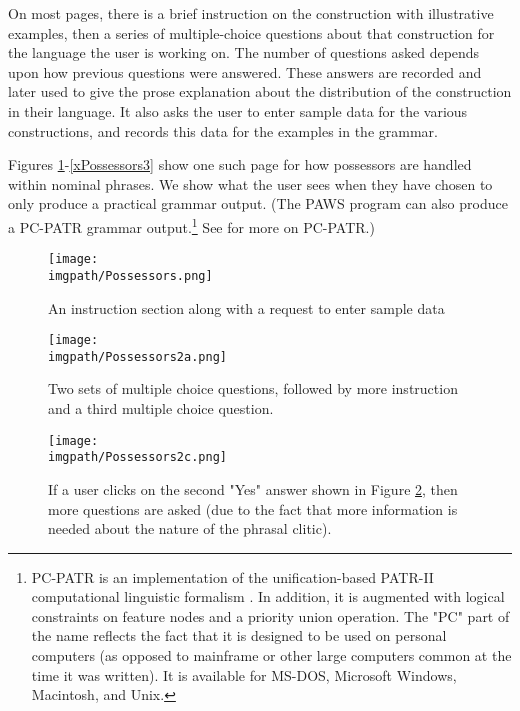 On most pages, there is a brief instruction on the construction with illustrative examples, then a series of multiple-choice questions about that construction for the language the user is working on. The number of questions asked depends upon how previous questions were answered. These answers are recorded and later used to give the prose explanation about the distribution of the construction in their language. It also asks the user to enter sample data for the various constructions, and records this data for the examples in the grammar.

Figures \ref{xPossesors1}-\ref{xPossessors3} show one such page for how possessors are handled within nominal phrases. We show what the user sees when they have chosen to only produce a practical grammar output. (The {PAWS} program can also produce a PC-PATR grammar output.\footnote{\label{nPC-PATR}
 PC-PATR is an implementation of the unification-based PATR-II computational linguistic formalism \citep{rShieber1986}. In addition, it is augmented with logical constraints on feature nodes and a priority union operation. The "PC" part of the name reflects the fact that it is designed to be used on personal computers (as opposed to mainframe or other large computers common at the time it was written). It is available for MS-DOS, Microsoft Windows, Macintosh, and Unix.
}  See \citet{rMcConnel} for more on PC-PATR.)
   
\clearpage
\begin{figure}[b]
\texttt{[image: \\imgpath/Possessors.png]} 
\caption{An instruction section along with a request to enter sample data}
\label{xPossesors1}%
\end{figure}
  
\clearpage
\begin{figure}[t]
\texttt{[image: \\imgpath/Possessors2a.png]}
\caption{Two sets of multiple choice questions, followed by more instruction and a third multiple choice question.}
 \label{xPossessor2}%
\end{figure}


\clearpage
\begin{figure}[t]
\texttt{[image: \\imgpath/Possessors2c.png]}
\caption{If a user clicks on the second "Yes" answer shown in Figure \ref{xPossessor2}, then more questions are asked (due to the fact that more information is needed about the nature of the phrasal clitic).}
 \label{xPossessor2c}%
\end{figure}


